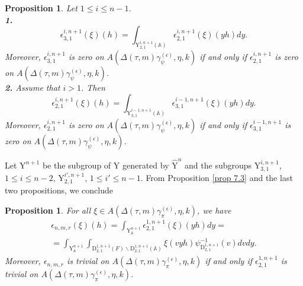 \documentclass[12pts]{amsart}
\newcommand{\BA}{{\mathbb {A}}}
\newtheorem{prop}[thm]{Proposition}
\begin{document}
\begin{prop}\label{prop 8.2}
	Let $1\leq i\leq n-1$.\\
	{\bf 1.} 
	$$
	\epsilon_{3,1}^{i,n+1}(\xi)(h)=\int_{\mathrm{Y}_{2,1}^{i,n+1}(\BA)}
	\epsilon_{2,1}^{i,n+1}(\xi)(yh)dy.
	$$ 	
	Moreover, $\epsilon_{3,1}^{i,n+1}$ is zero on $A(\Delta(\tau,m)\gamma_\psi^{(\epsilon)},\eta,k)$ if and
	only if $\epsilon_{2,1}^{i,n+1}$ is zero on $A(\Delta(\tau,m)\gamma_\psi^{(\epsilon)},\eta,k)$.\\
	{\bf 2.} Assume that $i>1$. Then 
	$$
	\epsilon_{2,1}^{i,n+1}(\xi)(h)=\int_{\mathrm{Y}_{3,1}^{i-1,n+1}(\BA)}
	\epsilon_{3,1}^{i-1,n+1}(\xi)(yh)dy.
	$$	
	Moreover, $\epsilon_{2,1}^{i,n+1}$ is zero on
	$A(\Delta(\tau,m)\gamma_\psi^{(\epsilon)},\eta,k)$ if and only if $\epsilon_{3,1}^{i-1,n+1}$ is zero on
	$A(\Delta(\tau,m)\gamma_\psi^{(\epsilon)},\eta,k)$.\\
	\end{prop}
Let $\mathrm{Y}^{n+1}$ be the subgroup of $\mathrm{Y}$ generated by $\hat{\mathrm{Y}}^n$ and the subgroups $\mathrm{Y}_{3,1}^{i,n+1}$, $1\leq i\leq n-2$, $\mathrm{Y}_{2,1}^{i',n+1}$, $1\leq i'\leq n-1$. From Proposition \ref{prop 7.3} and the last two propositions, we
conclude
\begin{prop}\label{prop 8.3}
	For all $\xi\in A(\Delta(\tau,m)\gamma_\pi^{(\epsilon)},\eta,k)$, we have
	\begin{multline*}
	\epsilon_{n,m,r}(\xi)(h)=\int_{\mathrm{Y}^{n+1}_\BA}\epsilon_{2,1}^{1,n+1}(\xi)(yh)dy
	=\\
	=\int_{\mathrm{Y}^{n+1}_\BA}\int_{\mathrm{D}_{2,1}^{1,n+1}(F)\backslash \mathrm{D}_{2,1}^{1,n+1}(\BA)}\xi(vyh)\psi^{-1}_{\mathrm{D}_{2,1}^{1,n+1}}(v)dvdy.
	\end{multline*}
	Moreover, $\epsilon_{n,m,r}$ is trivial on
	$A(\Delta(\tau,m)\gamma_\pi^{(\epsilon)},\eta,k)$ if and only if $\epsilon_{2,1}^{1,n+1}$ is trivial on 	$A(\Delta(\tau,m)\gamma_\pi^{(\epsilon)},\eta,k)$.
\end{prop}
\end{document}
